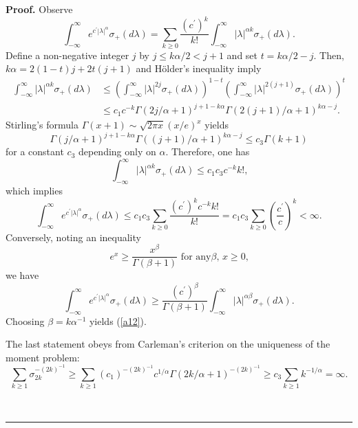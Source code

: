 \documentclass[a4paper]{article}%
\newenvironment{proof}[1][Proof]{\noindent\textbf{#1.} }{\ \rule{0.5em}{0.5em}}
\begin{document}
\begin{proof}
Observe%
\[
\int_{-\infty}^{\infty}e^{c^{\prime}\left\vert \lambda\right\vert ^{\alpha}%
}\sigma_{+}\left(  d\lambda\right)  =\sum_{k\geq0}\dfrac{\left(  c^{\prime
}\right)  ^{k}}{k!}\int_{-\infty}^{\infty}\left\vert \lambda\right\vert
^{\alpha k}\sigma_{+}\left(  d\lambda\right)  \text{.}%
\]
Define a non-negative integer $j$ by $j\leq k\alpha/2<j+1$ and set
$t=k\alpha/2-j$. Then,\ $k\alpha=2\left(  1-t\right)  j+2t\left(  j+1\right)
$ and H\"{o}lder's inequality imply%
\begin{align*}
\int_{-\infty}^{\infty}\left\vert \lambda\right\vert ^{\alpha k}\sigma
_{+}\left(  d\lambda\right)   &  \leq\left(  \int_{-\infty}^{\infty}\left\vert
\lambda\right\vert ^{2j}\sigma_{+}\left(  d\lambda\right)  \right)
^{1-t}\left(  \int_{-\infty}^{\infty}\left\vert \lambda\right\vert ^{2\left(
j+1\right)  }\sigma_{+}\left(  d\lambda\right)  \right)  ^{t}\\
&  \leq c_{1}c^{-k}\Gamma\left(  2j/\alpha+1\right)  ^{j+1-k\alpha}%
\Gamma\left(  2\left(  j+1\right)  /\alpha+1\right)  ^{k\alpha-j}\text{.}%
\end{align*}
Stirling's formula $\Gamma\left(  x+1\right)  \sim\sqrt{2\pi x}\left(
x/e\right)  ^{x}$ yields
\[
\Gamma\left(  j/\alpha+1\right)  ^{j+1-k\alpha}\Gamma\left(  \left(
j+1\right)  /\alpha+1\right)  ^{k\alpha-j}\leq c_{3}\Gamma\left(  k+1\right)
\]
for a constant $c_{3}$ depending only on $\alpha$. Therefore, one has%
\[
\int_{-\infty}^{\infty}\left\vert \lambda\right\vert ^{\alpha k}\sigma
_{+}\left(  d\lambda\right)  \leq c_{1}c_{3}c^{-k}k!\text{,}%
\]
which implies%
\[
\int_{-\infty}^{\infty}e^{c^{\prime}\left\vert \lambda\right\vert ^{\alpha}%
}\sigma_{+}\left(  d\lambda\right)  \leq c_{1}c_{3}\sum_{k\geq0}\dfrac{\left(
c^{\prime}\right)  ^{k}c^{-k}k!}{k!}=c_{1}c_{3}\sum_{k\geq0}\left(
\dfrac{c^{\prime}}{c}\right)  ^{k}<\infty\text{.}%
\]
Conversely, noting an inequality%
\[
e^{x}\geq\dfrac{x^{\beta}}{\Gamma\left(  \beta+1\right)  }\text{ \ for any
}\beta\text{, }x\geq0\text{,}%
\]
we have%
\[
\int_{-\infty}^{\infty}e^{c^{\prime}\left\vert \lambda\right\vert ^{\alpha}%
}\sigma_{+}\left(  d\lambda\right)  \geq\dfrac{\left(  c^{\prime}\right)
^{\beta}}{\Gamma\left(  \beta+1\right)  }\int_{-\infty}^{\infty}\left\vert
\lambda\right\vert ^{\alpha\beta}\sigma_{+}\left(  d\lambda\right)  \text{.}%
\]
Choosing $\beta=k\alpha^{-1}$ yields (\ref{a12}).

The last statement obeys from Carleman's criterion on the uniqueness of the
moment problem:%
\[
\sum_{k\geq1}\sigma_{2k}^{-\left(  2k\right)  ^{-1}}\geq\sum_{k\geq1}\left(
c_{1}\right)  ^{-\left(  2k\right)  ^{-1}}c^{1/\alpha}\Gamma\left(
2k/\alpha+1\right)  ^{-\left(  2k\right)  ^{-1}}\geq c_{3}\sum_{k\geq
1}k^{-1/\alpha}=\infty\text{.}%
\]

\end{proof}
\end{document}
